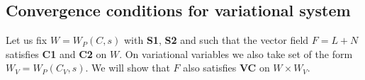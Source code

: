 
\subsection{Convergence conditions for variational system}

Let us fix $W=W_P(C,s)$ with \textbf{S1}, \textbf{S2} and such that the vector field $F=L+N$ satisfies \textbf{C1} and \textbf{C2} on $W$. On variational variables we also take set
of the form $W_V=W_P(C_V,s)$. We will show that $F$ also satisfies \textbf{VC} on $W\times W_V$.


%
%
%
%
